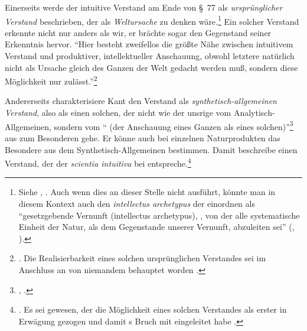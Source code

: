 \begin{nummerierung}
  \item Einerseits werde der intuitive Verstand am Ende von \S~77 als
  \emph{ursprünglicher Verstand} beschrieben, der als \emph{Weltursache} zu
  denken wäre.\footnote{Siehe \cite[][\S~77]{Kant:KritikderUrteilskraft2009},
  \cite[][V: 410.11]{Kant:GesammelteWerke1900ff.}. Auch wenn
   dies an dieser Stelle
  nicht ausführt, könnte man in diesem Kontext auch den \emph{intellectus
  archetypus} der  einordnen als
  \enquote{gesetzgebende Vernunft (intellectus archetypus), {\punkt}, von der
  alle systematische Einheit der Natur, als dem Gegenstande unserer Vernunft,
  abzuleiten sei} \mkbibparens{\cite[][B 723]{Kant:KritikderreinenVernunft2003},
  \cite[][III: 456.37--457.2]{Kant:GesammelteWerke1900ff.}}.} Ein solcher
  Verstand erkennte nicht nur anders als wir, er brächte sogar den Gegenstand
  seiner Erkenntnis hervor. \enquote{Hier besteht zweifellos die größte Nähe
  zwischen intuitivem Verstand und produktiver, intellektueller Anschauung,
  obwohl letztere natürlich nicht als Ursache gleich des Ganzen der Welt gedacht
  werden muß, sondern diese Möglichkeit nur
  zulässt.}\footnote{\cite[][179]{Foerster:DieBedeutungvonSS7677deremphKritikderUrteilskraftfuerdieEntwicklungdernachkantischenPhilosophieTeil12002}.
  Die Realisierbarkeit eines solchen ursprünglichen Verstandes sei im Anschluss
  an  von niemandem behauptet
  worden \parencite[vgl.][179]{Foerster:DieBedeutungvonSS7677deremphKritikderUrteilskraftfuerdieEntwicklungdernachkantischenPhilosophieTeil12002}.}
    \item Andererseits charakterisiere Kant den Verstand als
  \emph{synthetisch-allgemeinen Verstand}, also als einen solchen, der nicht wie
  der unsrige vom Analytisch-All\-ge\-mei\-nen, sondern vom
  \enquote{ (der Anschauung eines Ganzen als
  eines solchen)}\footnote{\cite[][\S~77]{Kant:KritikderUrteilskraft2009},
  \cite[][V: 407.21--22]{Kant:GesammelteWerke1900ff.}.} aus zum Besonderen gehe.
  Er könne auch bei einzelnen Naturprodukten das Besondere aus dem
  Synthetisch-All\-ge\-mei\-nen bestimmen. Damit beschreibe
   einen Verstand, der der \emph{scientia intuitiva} bei
  entspreche.\footnote{\cite[Vgl.][189]{Foerster:DieBedeutungvonSS7677deremphKritikderUrteilskraftfuerdieEntwicklungdernachkantischenPhilosophieTeil12002}.
  Es sei  gewesen, der die Möglichkeit eines
  solchen Verstandes als erster in Erwägung gezogen und damit
  s Bruch mit
   eingeleitet
  habe \parencite[vgl.][180--190]{Foerster:DieBedeutungvonSS7677deremphKritikderUrteilskraftfuerdieEntwicklungdernachkantischenPhilosophieTeil12002}.}
\end{nummerierung}
